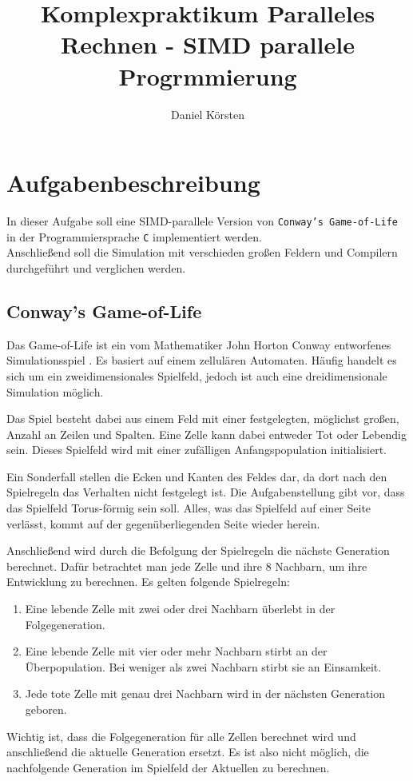 \documentclass[german,plainarticle,hyperref,utf8]{zihpub}
\author{Daniel Körsten}
\title{Komplexpraktikum Paralleles Rechnen - SIMD parallele Progrmmierung}
\begin{document}
	\section{Aufgabenbeschreibung}
	In dieser Aufgabe soll eine SIMD-parallele Version von \texttt{Conway’s Game-of-Life} in der Programmiersprache \texttt{C} implementiert werden.\\
	Anschließend soll die Simulation mit verschieden großen Feldern und Compilern durchgeführt und verglichen werden.
	
	\subsection{Conway’s Game-of-Life}
	Das Game-of-Life ist ein vom Mathematiker John Horton Conway entworfenes Simulationsspiel \cite{gardner}. Es basiert auf einem zellulären Automaten. Häufig handelt es sich um ein zweidimensionales Spielfeld, jedoch ist auch eine dreidimensionale Simulation möglich.
	
	Das Spiel besteht dabei aus einem Feld mit einer festgelegten, möglichst großen, Anzahl an Zeilen und Spalten. Eine Zelle kann dabei entweder Tot oder Lebendig sein. Dieses Spielfeld wird mit einer zufälligen Anfangspopulation initialisiert.
	
	Ein Sonderfall stellen die Ecken und Kanten des Feldes dar, da dort nach den Spielregeln das Verhalten nicht festgelegt ist. Die Aufgabenstellung gibt vor, dass das Spielfeld Torus-förmig sein soll. Alles, was das Spielfeld auf einer Seite verlässt, kommt auf der gegenüberliegenden Seite wieder herein.
	
	Anschließend wird durch die Befolgung der Spielregeln die nächste Generation berechnet. Dafür betrachtet man jede Zelle und ihre 8 Nachbarn, um ihre Entwicklung zu berechnen. Es gelten folgende Spielregeln:
	\begin{enumerate}
		\item Eine lebende Zelle mit zwei oder drei Nachbarn überlebt in der Folgegeneration.
		\item Eine lebende Zelle mit vier oder mehr Nachbarn stirbt an der Überpopulation. Bei weniger als zwei Nachbarn stirbt sie an Einsamkeit.
		\item Jede tote Zelle mit genau drei Nachbarn wird in der nächsten Generation geboren.
	\end{enumerate}
	Wichtig ist, dass die Folgegeneration für alle Zellen berechnet wird und anschließend die aktuelle Generation ersetzt. Es ist also nicht möglich, die nachfolgende Generation im Spielfeld der Aktuellen zu berechnen.
	
\end{document}

